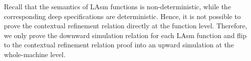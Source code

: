 Recall that the semantics of LAsm functions is non-deterministic, while the
corresponding deep specifications are deterministic.
Hence, it is not possible to prove the contextual refinement relation 
directly at the function level. 
Therefore, we only prove the downward simulation relation for each LAsm function
and flip to the contextual refinement relation proof into an upward simulation
at the whole-machine level. 






